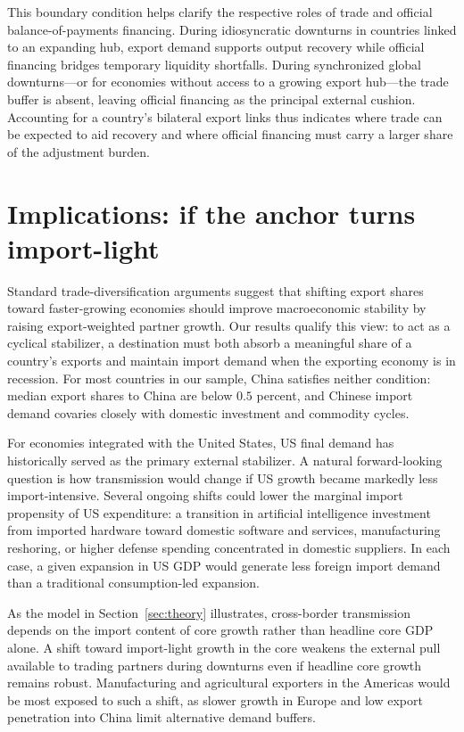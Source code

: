 \documentclass[12pt, a4paper]{article}
\begin{document}
This boundary condition helps clarify the respective roles of trade and official balance-of-payments financing. During idiosyncratic downturns in countries linked to an expanding hub, export demand supports output recovery while official financing bridges temporary liquidity shortfalls. During synchronized global downturns---or for economies without access to a growing export hub---the trade buffer is absent, leaving official financing as the principal external cushion. Accounting for a country's bilateral export links thus indicates where trade can be expected to aid recovery and where official financing must carry a larger share of the adjustment burden.

\section{Implications: if the anchor turns import-light}\label{sec:scenario}

Standard trade-diversification arguments suggest that shifting export shares toward faster-growing economies should improve macroeconomic stability by raising export-weighted partner growth. Our results qualify this view: to act as a cyclical stabilizer, a destination must both absorb a meaningful share of a country's exports and maintain import demand when the exporting economy is in recession. For most countries in our sample, China satisfies neither condition: median export shares to China are below $0.5$ percent, and Chinese import demand covaries closely with domestic investment and commodity cycles.

For economies integrated with the United States, US final demand has historically served as the primary external stabilizer. A natural forward-looking question is how transmission would change if US growth became markedly less import-intensive. Several ongoing shifts could lower the marginal import propensity of US expenditure: a transition in artificial intelligence investment from imported hardware toward domestic software and services, manufacturing reshoring, or higher defense spending concentrated in domestic suppliers. In each case, a given expansion in US GDP would generate less foreign import demand than a traditional consumption-led expansion.

As the model in Section~\ref{sec:theory} illustrates, cross-border transmission depends on the import content of core growth rather than headline core GDP alone. A shift toward import-light growth in the core weakens the external pull available to trading partners during downturns even if headline core growth remains robust. Manufacturing and agricultural exporters in the Americas would be most exposed to such a shift, as slower growth in Europe and low export penetration into China limit alternative demand buffers.
\end{document}
